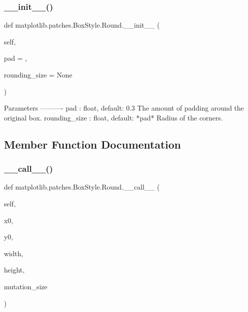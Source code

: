 \subsubsection{\texorpdfstring{\+\_\+\+\_\+init\+\_\+\+\_\+()}{\_\_init\_\_()}}
{\footnotesize\ttfamily def matplotlib.\+patches.\+Box\+Style.\+Round.\+\_\+\+\_\+init\+\_\+\+\_\+ (\begin{DoxyParamCaption}\item[{}]{self,  }\item[{}]{pad = {},  }\item[{}]{rounding\+\_\+size = {\ttfamily None} }\end{DoxyParamCaption})}

\begin{DoxyVerb}Parameters
----------
pad : float, default: 0.3
    The amount of padding around the original box.
rounding_size : float, default: *pad*
    Radius of the corners.
\end{DoxyVerb}
 

\subsection{Member Function Documentation}
\mbox{\label{classmatplotlib_1_1patches_1_1BoxStyle_1_1Round_ac408f6e20871b1ba5c12cedf08463130}} 
\subsubsection{\texorpdfstring{\+\_\+\+\_\+call\+\_\+\+\_\+()}{\_\_call\_\_()}}
{\footnotesize\ttfamily def matplotlib.\+patches.\+Box\+Style.\+Round.\+\_\+\+\_\+call\+\_\+\+\_\+ (\begin{DoxyParamCaption}\item[{}]{self,  }\item[{}]{x0,  }\item[{}]{y0,  }\item[{}]{width,  }\item[{}]{height,  }\item[{}]{mutation\+\_\+size }\end{DoxyParamCaption})}



